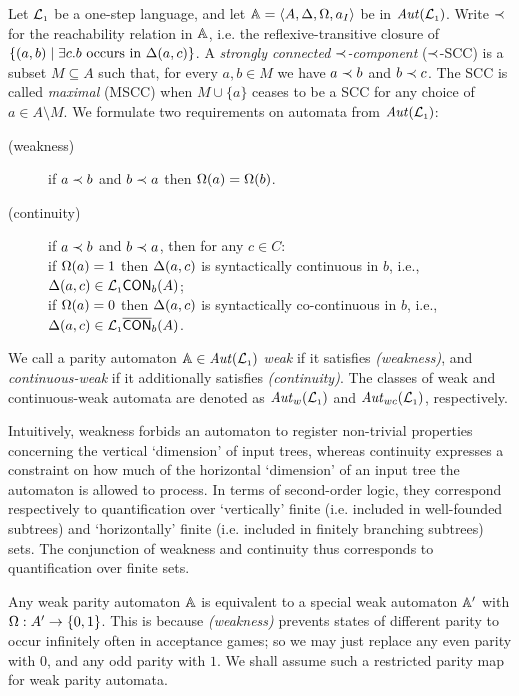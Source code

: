 \begin{definition}
\label{d:wk}
\label{d:ctwk}
Let $\mathcal{L}_{\scriptscriptstyle 1}$ be a one-step language, and let $\mathbb{A} = \langle{A,\Delta,\Omega,a_I}\rangle$
be in $\mathit{Aut}(\mathcal{L}_{\scriptscriptstyle 1})$. Write $\prec$ for the reachability relation in $\mathbb{A}$, i.e.
the reflexive-transitive closure of $\{ (a,b) \mid \exists c. b \text{ occurs 
in }\tmap(a,c)\}$. 
A \emph{strongly connected $\prec$-component} ($\prec$-SCC) is a subset $M
\subseteq A$ such that, for every $a,b \in M$ we have $a \prec b$ and $b \prec c$.
The SCC is called \emph{maximal} (MSCC) when $M\cup\{a\}$ ceases to be a SCC for
any choice of $a \in A\setminus M$.
We formulate two requirements on automata from $\mathit{Aut}(\mathcal{L}_{\scriptscriptstyle 1})$:
\begin{description}
\item[(weakness)] if $a \prec b$ and $b \prec a$ then $\Omega(a) = \Omega(b)$.
\item[(continuity)] if $a \prec b$ and $b \prec a$, then for any $c\in C$:
  \\ if ${\Omega(a)}=1$ then $\Delta(a,c)$ is syntactically continuous in $b$,
     i.e., $\Delta(a,c) \in \mathcal{L}_{\scriptscriptstyle 1}\mathsf{CON}_{b}(A)$;
  \\ if ${\Omega(a)}=0$ then $\Delta(a,c)$ is syntactically co-continuous in $b$,
     i.e., $\Delta(a,c) \in \mathcal{L}_{\scriptscriptstyle 1}\overline{\mathsf{CON}}_{b}(A)$.
\end{description}
We call a parity automaton $\mathbb{A} \in \mathit{Aut}(\mathcal{L}_{\scriptscriptstyle 1})$ \emph{weak} if it satisfies
\emph{(weakness)}, and \emph{continuous-weak} if it additionally satisfies 
\emph{(continuity)}.
The classes of weak and continuous-weak automata are denoted as $\mathit{Aut}_{w}(\mathcal{L}_{\scriptscriptstyle 1})$
and $\mathit{Aut}_{wc}(\mathcal{L}_{\scriptscriptstyle 1})$, respectively.
\end{definition}

Intuitively, weakness forbids an automaton to register non-trivial properties 
concerning the vertical `dimension' of input trees, whereas continuity expresses
a constraint on how much of the horizontal `dimension' of an input tree the 
automaton is allowed to process. 
In terms of second-order logic, they correspond respectively to quantification 
over `vertically' finite (i.e. included in well-founded subtrees) and 
`horizontally' finite (i.e. included in finitely branching subtrees) sets. 
The conjunction of weakness and continuity thus corresponds to quantification 
over finite sets. 

\begin{remark}\label{rmk:weak01}
Any weak parity automaton $\mathbb{A}$ is equivalent to a special weak automaton
$\mathbb{A}'$ with $\Omega: A' \to \{0,1\}$. 
This is because \emph{(weakness)} prevents states of different parity to occur
infinitely often in acceptance games; so we may just replace any even parity 
with $0$, and any odd parity with $1$.
We shall assume such a restricted parity map for weak parity automata.
\end{remark}

